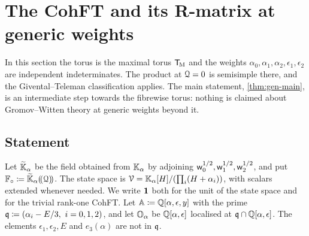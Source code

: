 \section{The CohFT and its R-matrix at generic weights}
\label{sec:gen}

In this section the torus is the maximal torus $\mathsf{T}_{\!\mathrm{M}}$ and the weights $\alpha_0,\alpha_1,\alpha_2,\epsilon_1,\epsilon_2$ are independent indeterminates. The product at $\mathcal{Q}=0$ is semisimple there, and the Givental--Teleman classification applies. The main statement, \cref{thm:gen-main}, is an intermediate step towards the fibrewise torus: nothing is claimed about Gromov--Witten theory at generic weights beyond it.

\subsection{Statement}

Let $\widetilde{\mathbb{K}}_{\alpha}$ be the field obtained from $\mathbb{K}_{\alpha}$ by adjoining $\mathsf{w}_0^{1/2},\mathsf{w}_1^{1/2},\mathsf{w}_2^{1/2}$, and put $\mathbb{F}_{\circ}\coloneqq\widetilde{\mathbb{K}}_{\alpha}(\!(\mathcal{Q})\!)$. The state space is $\mathcal{V}=\mathbb{K}_{\alpha}[H]/(\prod_i(H+\alpha_i))$, with scalars extended whenever needed. We write $\mathbf{1}$ both for the unit of the state space and for the trivial rank-one CohFT. Let $\mathbb{A}\coloneqq\mathbb{Q}[\alpha,\epsilon,y]$ with the prime $\primeq\coloneqq(\alpha_i-E/3,\ i=0,1,2)$, and let $\mathbb{O}_{\alpha}$ be $\mathbb{Q}[\alpha,\epsilon]$ localised at $\mathfrak{q}\cap\mathbb{Q}[\alpha,\epsilon]$. The elements $\epsilon_1,\epsilon_2,E$ and $e_3(\alpha)$ are not in $\mathfrak{q}$.

